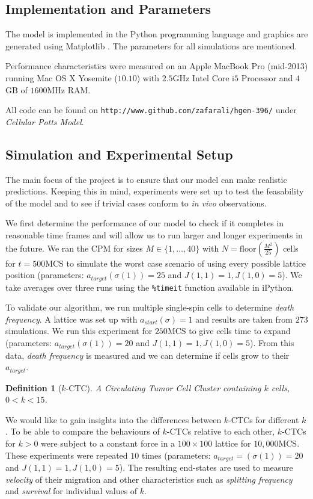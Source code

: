 \documentclass[12pt]{article}
\newtheorem{definition}{Definition}
\def\code#1{\texttt{#1}}
\begin{document}
\subsection{Implementation and Parameters}
The model is implemented in the Python programming language and graphics are generated using Matplotlib \cite{matplotlib}. The parameters for all simulations are mentioned.

Performance characteristics were measured on an Apple MacBook Pro (mid-2013) running Mac OS X Yosemite ($10.10$) with $2.5$GHz Intel Core i$5$ Processor and $4$GB of $1600$MHz RAM.

All code can be found on \code{http://www.github.com/zafarali/hgen-396/} under \emph{Cellular Potts Model}.

\subsection{Simulation and Experimental Setup}
The main focus of the project is to ensure that our model can make realistic predictions. Keeping this in mind, experiments were set up to test the feasability of the model and to see if trivial cases conform to \emph{in vivo} observations. 

We first determine the performance of our model to check if it completes in reasonable time frames and will allow us to run larger and longer experiments in the future. We ran the CPM for sizes $M\in\{1, \ldots , 40\}$ with $N=\text{floor}(\frac{M^2}{25})$ cells for $t=500$MCS to simulate the worst case scenario of using every possible lattice position (parameters: $a_{target}(\sigma(1))=25$ and $J(1,1)=1, J(1,0)=5$). We take averages over three runs using the \code{\%timeit} function available in iPython.

To validate our algorithm, we run multiple single-spin cells to determine \emph{death frequency}. A lattice was set up with $a_{start}(\sigma)=1$ and results are taken from $273$ simulations. We run this experiment for $250$MCS to give cells time to expand (parameters: $a_{target}(\sigma(1))=20$ and $J(1,1)=1, J(1,0)=5$). From this data, \emph{death frequency} is measured and we can determine if cells grow to their $a_{target}$.

\begin{definition}[$k$-CTC]
A Circulating Tumor Cell Cluster containing $k$ cells, $0<k<15$.
\end{definition}

We would like to gain insights into the differences between $k$-CTCs for different $k$. To be able to compare the behaviours of $k$-CTCs relative to each other, $k$-CTCs for $k>0$ were subject to a constant force in a $100\times100$ lattice for $10,000$MCS. These experiments were repeated $10$ times (parameters: $a_{target}=(\sigma(1))=20$ and $J(1,1)=1, J(1,0)=5$). The resulting end-states are used to measure \emph{velocity} of their migration and other characteristics such as \emph{splitting frequency} and \emph{survival} for individual values of $k$.
\end{document}
